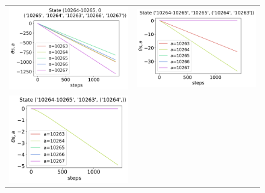 \begin{figure}[!htp]
    \centering
    \begin{tabular}{cc}
        \includegraphics[scale=0.36,valign=b]{chapters/figures/theta_NPG_state_0.png} &
        \includegraphics[scale=0.36,valign=b]{chapters/figures/theta_NPG_state_1.png} \\
        \hspace*{-10pt}\includegraphics[scale=0.36,valign=b]{chapters/figures/theta_NPG_state_2.png} &

\end{tabular}
\end{figure}
